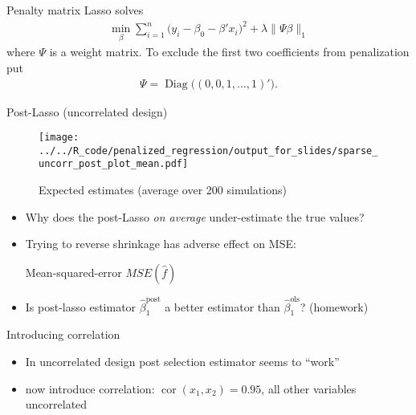 \documentclass[xcolor=dvipsnames, handout]{beamer}
\DeclareMathOperator{\diag}{Diag}
\DeclareMathOperator{\cor}{cor}
\begin{document}
\begin{frame}{Penalty matrix}
Lasso solves 
  \begin{align*}
    \min_{\beta} \sum_{i=1}^n \big(y_i - \beta_0 - \beta' x_i \big)^2 + \lambda \lVert \Psi \beta \rVert_1  
  \end{align*}
where $\Psi$ is a weight matrix. To exclude the first two coefficients from penalization put
\begin{align*}
  \Psi = \diag\big((0, 0, 1, \dotsc, 1)'\big).
\end{align*}
\end{frame}

\begin{frame}{Post-Lasso (uncorrelated design)}
\begin{figure}
  \texttt{[image: ../../R\_code/penalized\_regression/output\_for\_slides/sparse\_uncorr\_post\_plot\_mean.pdf]}
   \caption{Expected estimates (average over 200 simulations)}
\end{figure}
\end{frame}

\begin{frame}{}
  
  \begin{itemize}
    \item 
    Why does the post-Lasso \emph{on average} under-estimate the true values?
    \item Trying to reverse shrinkage has adverse effect on MSE:  
    \begin{table}
    
      \caption{Mean-squared-error $MSE(\hat{f})$}
    \end{table}
    \item 
    Is post-lasso estimator $\hat{\beta}_1^{\text{post}}$ a better estimator than $\hat{\beta}_1^{\text{ols}}$? (homework)
  \end{itemize}
\end{frame}

\begin{frame}{Introducing correlation}
    \begin{itemize}
      \item In uncorrelated design post selection estimator seems to ``work''
      \item now introduce correlation: $\cor(x_1, x_2) = 0.95$, all other variables uncorrelated
    \end{itemize}
\end{frame}
\end{document}
